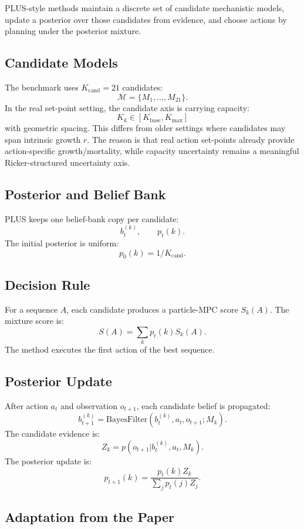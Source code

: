 \documentclass[11pt]{article}
\newcommand{\1}{\mathbf{1}}
\begin{document}
PLUS-style methods maintain a discrete set of candidate mechanistic models,
update a posterior over those candidates from evidence, and choose actions by
planning under the posterior mixture.

\subsection{Candidate Models}

The benchmark uses $K_{\mathrm{cand}}=21$ candidates:
\[
  \mathcal{M}=\{M_1,\ldots,M_{21}\}.
\]
In the real set-point setting, the candidate axis is carrying capacity:
\[
  K_k \in [K_{\mathrm{base}},K_{\max}]
\]
with geometric spacing.  This differs from older settings where candidates may
span intrinsic growth $r$.  The reason is that real action set-points already
provide action-specific growth/mortality, while capacity uncertainty remains a
meaningful Ricker-structured uncertainty axis.

\subsection{Posterior and Belief Bank}

PLUS keeps one belief-bank copy per candidate:
\[
  b_t^{(k)},\qquad p_t(k).
\]
The initial posterior is uniform:
\[
  p_0(k)=1/K_{\mathrm{cand}}.
\]

\subsection{Decision Rule}

For a sequence $A$, each candidate produces a particle-MPC score $S_k(A)$.
The mixture score is:
\[
  S(A)=\sum_k p_t(k)S_k(A).
\]
The method executes the first action of the best sequence.

\subsection{Posterior Update}

After action $a_t$ and observation $o_{t+1}$, each candidate belief is
propagated:
\[
  b_{t+1}^{(k)}=\mathrm{BayesFilter}(b_t^{(k)},a_t,o_{t+1};M_k).
\]
The candidate evidence is:
\[
  Z_k = p(o_{t+1}|b_t^{(k)},a_t,M_k).
\]
The posterior update is:
\[
  p_{t+1}(k)=
  \frac{p_t(k)Z_k}{\sum_jp_t(j)Z_j}.
\]

\subsection{Adaptation from the Paper}
\end{document}
